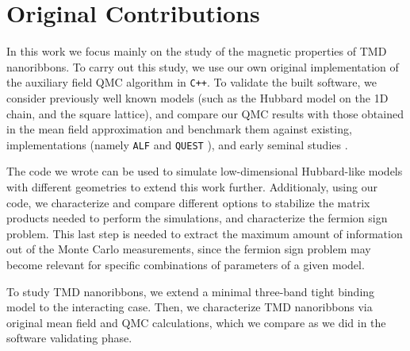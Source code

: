 \section{Original Contributions}
\label{sec:int_contributions}

In this work we focus mainly on the study of the magnetic properties of \ac{TMD} nanoribbons.
To carry out this study, we use our own original implementation of the auxiliary field \ac{QMC} algorithm in \texttt{C++}.
To validate the built software, we consider previously well known models (such as the Hubbard model on the \acs{1D} chain, and the square lattice), and compare our \ac{QMC} results with those obtained in the mean field approximation and benchmark them against existing,   implementations (namely \texttt{ALF} \cite{bercx_alf_2017} and \texttt{QUEST} \cite{noauthor_quest_2012}), and early seminal studies \cite{hirsch_discrete_1983,white_numerical_1989}.

The code we wrote can be used to simulate low-dimensional Hubbard-like models with different geometries to extend this work further.
Additionaly, using our code, we characterize and compare different options to stabilize the matrix products needed to perform the simulations, and characterize the fermion sign problem.
This last step is needed to extract the maximum amount of information out of the Monte Carlo measurements, since the fermion sign problem may become relevant for specific combinations of parameters of a given model.

To study \ac{TMD} nanoribbons, we extend a minimal three-band tight binding model \cite{liu_three-band_2013} to the interacting case.
Then, we characterize \ac{TMD} nanoribbons via original mean field and \ac{QMC} calculations, which we compare as we did in the software validating phase.
